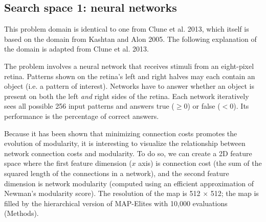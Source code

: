 \documentclass[twocolumn, DIV25, 9pt]{scrartcl}
\newcommand{\todoOfficialVersion}[1]{} %
\begin{document}
\subsection{Search space 1: neural networks}

\todoOfficialVersion{add background on how the space of neural networks is super high D, so we need stochastic search algorithms to find their weights (and possibly topology) when doing RL, as opposed to supervised learning, where backprop can work}

This problem domain is identical to one from Clune et al. 2013\cite{clune2013originModularity}, which itself is based on the domain from Kashtan and Alon 2005\cite{kashtan2005spontaneous}. The following explanation of the domain is adapted from Clune et al. 2013\cite{clune2013originModularity}.
  
The problem involves a neural network that receives stimuli
from an eight-pixel retina. Patterns shown on the retina's left and right
halves may each contain an object (i.e. a pattern of interest). Networks have to answer
whether an object is present on both the left \emph{and} right sides
of the retina\cite{kashtan2005spontaneous, clune2013originModularity}. Each network iteratively sees all possible 256 input patterns and answers true ($\geq0$) or false ($<0$). Its performance is the percentage of correct answers. 

\todoOfficialVersion{in the following paragraph you say squared length...confirm with JBM that it is squared}
Because it has been shown that minimizing connection costs promotes the evolution of modularity\cite{clune2013originModularity}, it is interesting to visualize the relationship between network connection costs and modularity. To do so, we can create a 2D feature space where the first feature dimension ($x$ axis) is connection cost (the sum of the squared length of the connections in a network\cite{clune2013originModularity}), and the second feature dimension is network modularity (computed using an efficient approximation of Newman's modularity score\cite{Leicht2008}). The resolution of the map is 512 $\times$ 512; the map is filled by the hierarchical version of MAP-Elites with 10,000 evaluations (Methods). 
\end{document}
